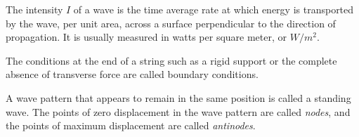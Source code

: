 \documentclass[nobib,notoc]{tufte-handout}
\begin{document}
\begin{defi}[Intensity]
	The intensity \(I\) of a wave is the time average rate at which energy is transported by the wave, per unit area, across a surface perpendicular to the direction of propagation. It is usually measured in watts per square meter, or \(W/m^2\).
\end{defi}
\begin{defi}
	The conditions at the end of a string such as a rigid support or the complete absence of transverse force are called boundary conditions.
\end{defi}
\begin{defi}
	A wave pattern that appears to remain in the same position is called a standing wave. The points of zero displacement in the wave pattern are called \emph{nodes}, and the points of maximum displacement are called \emph{antinodes}.
\end{defi}
\end{document}
